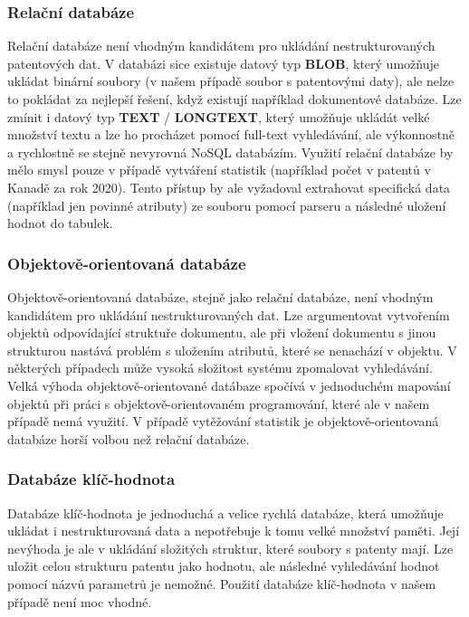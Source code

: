 \subsubsection{Relační databáze}
Relační databáze není vhodným kandidátem pro ukládání nestrukturovaných patentových dat. V databázi sice existuje datový typ \textbf{BLOB}, který umožňuje ukládat binární soubory (v našem případě soubor s patentovými daty), ale nelze to pokládat za nejlepší řešení, když existují například dokumentové databáze. Lze zmínit i datový typ \textbf{TEXT} / \textbf{LONGTEXT}, který umožňuje ukládát velké množství textu a lze ho procházet pomocí full-text vyhledávání, ale výkonnostně a rychlostně se stejně nevyrovná NoSQL databázím. 
\newline
\indent Využití relační databáze by mělo smysl pouze v případě vytváření statistik (například počet v patentů v Kanadě za rok 2020). Tento přístup by ale vyžadoval extrahovat specifická data (například jen povinné atributy) ze souboru pomocí parseru a následné uložení hodnot do tabulek. 

\subsubsection{Objektově-orientovaná databáze}
Objektově-orientovaná databáze, stejně jako relační databáze, není vhodným kandidátem pro ukládání nestrukturovaných dat. Lze argumentovat vytvořením objektů odpovídající struktuře dokumentu, ale při vložení dokumentu s jinou strukturou nastává problém s uložením atributů, které se nenachází v objektu. V některých případech může vysoká složitost systému zpomalovat vyhledávání. Velká výhoda objektově-orientované datábaze spočívá v jednoduchém mapování objektů při práci s objektově-orientovaném programování, které ale v našem případě nemá využití. V případě vytěžování statistik je objektově-orientovaná databáze horší volbou než relační databáze.

\subsubsection{Databáze klíč-hodnota}
Databáze klíč-hodnota je jednoduchá a velice rychlá databáze, která umožňuje ukládat i nestrukturovaná data a nepotřebuje k tomu velké množství paměti. Její nevýhoda je ale v ukládání složitých struktur, které soubory s patenty mají. Lze uložit celou strukturu patentu jako hodnotu, ale následné vyhledávání hodnot pomocí názvů parametrů je nemožné. Použití databáze klíč-hodnota v našem případě není moc vhodné.

